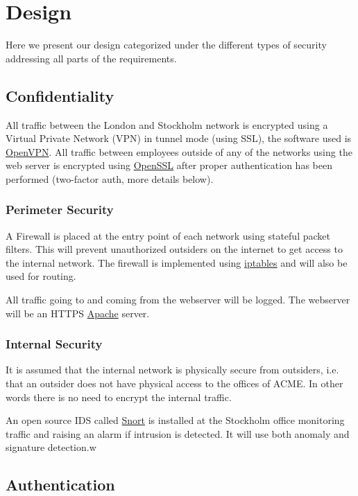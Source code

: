 \section*{Design}

Here we present our design categorized under the different types of security addressing all parts of the requirements.

\subsection*{Confidentiality}

All traffic between the London and Stockholm network is encrypted using a Virtual Private Network (VPN) in tunnel mode (using SSL), the software used is \href{http://openvpn.net/}{OpenVPN}. All traffic between employees outside of any of the networks using the web server is encrypted using \href{http://www.openssl.org/}{OpenSSL} after proper authentication has been performed (two-factor auth, more details below).

\subsubsection*{Perimeter Security}

A Firewall is placed at the entry point of each network using stateful packet filters. This will prevent unauthorized outsiders on the internet to get access to the internal network. The firewall is implemented using \href{http://en.wikipedia.org/wiki/Iptables}{iptables} and will also be used for routing.

All traffic going to and coming from the webserver will be logged. The webserver will be an HTTPS \href{http://httpd.apache.org/}{Apache} server.

\subsubsection*{Internal Security}

It is assumed that the internal network is physically secure from outsiders, i.e. that an outsider does not have physical access to the offices of ACME. In other words there is no need to encrypt the internal traffic.

An open source IDS called \href{https://www.snort.org/}{Snort} is installed at the Stockholm office monitoring traffic and raising an alarm if intrusion is detected. It will use both anomaly and signature detection.w

\subsection*{Authentication}

